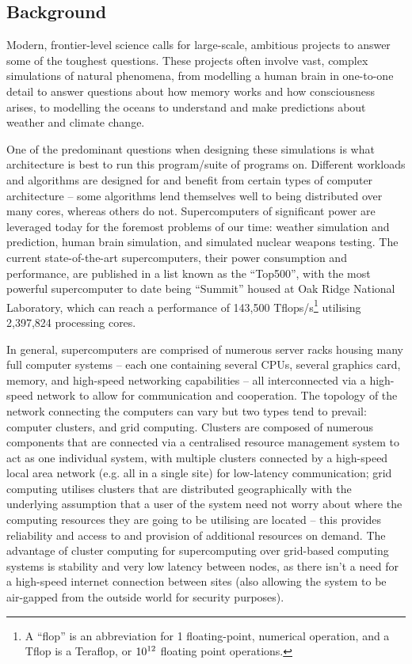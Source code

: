 \documentclass[conference]{IEEEtran}
\begin{document}
\subsection{Background}

Modern, frontier-level science calls for large-scale, ambitious projects to answer some of the toughest questions. These projects often involve vast, complex simulations of natural phenomena, from modelling a human brain in one-to-one detail to answer questions about how memory works and how consciousness arises, to modelling the oceans to understand and make predictions about weather and climate change.

One of the predominant questions when designing these simulations is what architecture is best to run this program/suite of programs on. Different workloads and algorithms are designed for and benefit from certain types of computer architecture – some algorithms lend themselves well to being distributed over many cores, whereas others do not. Supercomputers of significant power are leveraged today for the foremost problems of our time: weather simulation and prediction\cite{metoffice}, human brain simulation\cite{humanbrain}, and simulated nuclear weapons testing\cite{nuclear}. The current state-of-the-art supercomputers, their power consumption and performance, are published in a list known as the ``Top500”\cite{top500}, with the most powerful supercomputer to date being ``Summit” housed at Oak Ridge National Laboratory, which can reach a performance of 143,500 Tflops/s\footnote{A ``flop” is an abbreviation for 1 floating-point, numerical operation, and a Tflop is a Teraflop, or $10\textsuperscript{12}$ floating point operations.} utilising 2,397,824 processing cores.

In general, supercomputers are comprised of numerous server racks housing many full computer systems – each one containing several CPUs, several graphics card, memory, and high-speed networking capabilities – all interconnected via a high-speed network to allow for communication and cooperation. The topology of the network connecting the computers can vary but two types tend to prevail: computer clusters, and grid computing. Clusters are composed of numerous components that are connected via a centralised resource management system to act as one individual system, with multiple clusters connected by a high-speed local area network (e.g. all in a single site) for low-latency communication; grid computing utilises clusters that are distributed geographically with the underlying assumption that a user of the system need not worry about where the computing resources they are going to be utilising are located – this provides reliability and access to and provision of additional resources on demand. The advantage of cluster computing for supercomputing over grid-based computing systems is stability and very low latency between nodes, as there isn’t a need for a high-speed internet connection between sites (also allowing the system to be air-gapped from the outside world for security purposes).
\end{document}
